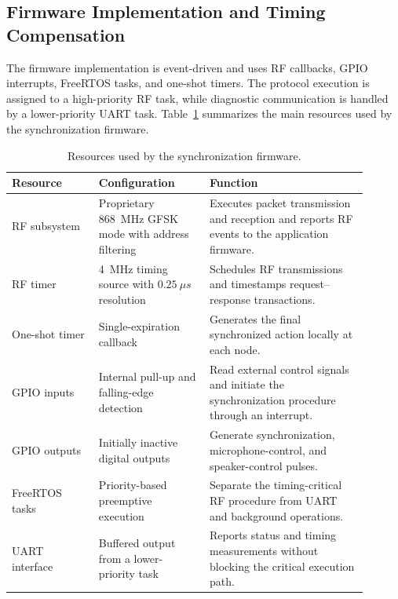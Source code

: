\subsection{Firmware Implementation and Timing Compensation}

The firmware implementation is event-driven and uses RF callbacks, GPIO interrupts, FreeRTOS tasks, and one-shot timers. The protocol execution is assigned to a high-priority RF task, while diagnostic communication is handled by a lower-priority UART task. Table~\ref{tab:sync_resources} summarizes the main resources used by the synchronization firmware.

\begin{table}[h]
    \centering
    \caption{Resources used by the synchronization firmware.}
    \label{tab:sync_resources}
    \begin{tabular}{|p{0.22\linewidth}|p{0.28\linewidth}|p{0.40\linewidth}|}
        \hline
        \textbf{Resource} & \textbf{Configuration} & \textbf{Function} \\
        \hline
        RF subsystem &
        Proprietary 868~MHz GFSK mode with address filtering &
        Executes packet transmission and reception and reports RF events to the application firmware. \\
        \hline
        RF timer &
        4~MHz timing source with $0.25~\mu s$ resolution &
        Schedules RF transmissions and timestamps request--response transactions. \\
        \hline
        One-shot timer &
        Single-expiration callback &
        Generates the final synchronized action locally at each node. \\
        \hline
        GPIO inputs &
        Internal pull-up and falling-edge detection &
        Read external control signals and initiate the synchronization procedure through an interrupt. \\
        \hline
        GPIO outputs &
        Initially inactive digital outputs &
        Generate synchronization, microphone-control, and speaker-control pulses. \\
        \hline
        FreeRTOS tasks &
        Priority-based preemptive execution &
        Separate the timing-critical RF procedure from UART and background operations. \\
        \hline
        UART interface &
        Buffered output from a lower-priority task &
        Reports status and timing measurements without blocking the critical execution path. \\
        \hline
    \end{tabular}
\end{table}

